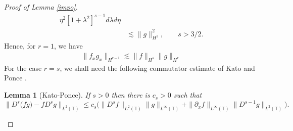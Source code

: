 \documentclass[12pt,reqno]{amsart}
\numberwithin{equation}{section}  %
\newcommand{\ci}{\mathbb{T}}
\newcommand{\p}{\partial}
\newtheorem{lemma}[theorem]{Lemma}
\begin{document}
\begin{proof}[Proof of Lemma \ref{impo}]
\begin{equation*}
\begin{split}
{  \eta^{2}}{\left[ 1 + \lambda^{2} \right]^{s-1}} d \lambda d \eta
  \\
  & \lesssim \| g \|_{H^{1}}^{2}, \qquad s > 3/2.
\end{split}
\end{equation*}
%
%
Hence, for $r=1$, we have
%
%
\begin{equation*}
\begin{split}
  \| f_{x} g_{x} \|_{H^{r-1}} \lesssim \| f \|_{H^{s}} \| g \|_{H^{r}}
\end{split}
\end{equation*}
%
%
For the case $r=s$, we shall need the following commutator estimate of Kato and
Ponce \cite{Kato_1988_Commutator-esti}. 
%
%
\begin{lemma}[Kato-Ponce] \label{KP-lemma}
If  $s>0$ then there is $c_s>0$ such that 
%
%
%
\begin{equation} \label{KP-com-est}
\| D^{s} \big(fg) -  f D^s g\|_{L^2(\ci)}
\le
c_s \big(
\| D^{s}f \|_{L^2(\ci)}    \| g \|_{L^\infty(\ci)} +
\| \p_xf \|_{L^\infty(\ci)}    \| D^{s-1}g \|_{L^2(\ci)}   \big).
\end{equation}
%
%
%
\end{lemma}
%
%
%
%
%
\end{proof}






        

        
\end{document}
